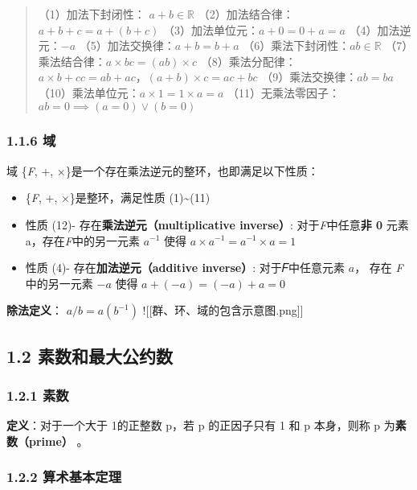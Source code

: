 \begin{quote}
（1）加法下封闭性： \(a + b \in \mathbb{R}\) （2）加法结合律：
\(a + b + 𝑐 = a + (b + 𝑐)\) （3）加法单位元：\(a + 0 = 0 + a = a\)
（4）加法逆元：\(−a\) （5）加法交换律：\(a + b = b + a\)
（6）乘法下封闭性：\(ab \in \mathbb{R}\)
（7）乘法结合律：\(a× bc = (ab)×c\)
（8）乘法分配律：\(a× b+𝑐c= ab+ac，(a+b)×c= ac+bc\)
（9）乘法交换律：\(ab = ba\) （10）乘法单位元：\(a×1 = 1×a = a\)
（11）无乘法零因子：\(ab = 0 ⟹ (a = 0) \lor  (b = 0)\)
\end{quote}

\subsubsection{1.1.6 域}\label{ux57df}

域 \{\emph{F}, +, ×\}是一个存在乘法逆元的整环，也即满足以下性质：

\begin{itemize}
\tightlist
\item
  \{\emph{F}, +, ×\}是整环，满足性质 (1)\textasciitilde(11)
\item
  性质 (12)- 存在\textbf{乘法逆元（multiplicative inverse）}:
  对于\emph{F}中任意\textbf{非 0} 元素 a，存在\emph{F}中的另一元素
  \(a^{-1}\) 使得 \(a×a^{-1} = a^{-1}×a=1\)
\item
  性质 (4)- 存在\textbf{加法逆元（additive inverse）}: 对于𝐹中任意元素
  \(a\)， 存在 \emph{F} 中的另一元素 \(−a\) 使得 \(a+(−a) =(−a) +a=0\)
\end{itemize}

\textbf{除法定义}： \(a/b = a(b^{-1})\)
!{[}{[}群、环、域的包含示意图.png{]}{]}

\subsection{1.2
素数和最大公约数}\label{ux7d20ux6570ux548cux6700ux5927ux516cux7ea6ux6570}

\subsubsection{1.2.1 素数}\label{ux7d20ux6570}

\textbf{定义}：对于一个大于 1的正整数 p，若 p 的正因子只有 1 和 p
本身，则称 p 为\textbf{素数（prime）} 。

\subsubsection{1.2.2
算术基本定理}\label{ux7b97ux672fux57faux672cux5b9aux7406}

